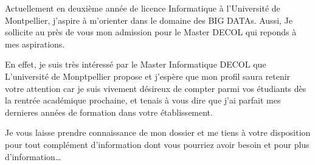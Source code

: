 \documentclass[10pt,stdletter]{newlfm}
\begin{document}
\begin{newlfm}


Actuellement en deuxième année de licence Informatique à l'Université de Montpellier, j'aspire à m'orienter dans le domaine des BIG DATAs. Aussi, Je sollicite au près de vous mon admission pour le Master DECOL qui reponds à mes aspirations.

En effet, je suis très intéressé par le Master Informatique DECOL que L'université de Monptpellier propose et j'espère que mon profil saura retenir votre attention car je suis vivement désireux de compter parmi vos étudiants dès la rentrée académique prochaine, et tenais à vous dire que j'ai parfait mes dernieres années de formation dans votre établissement.

Je vous laisse prendre connaissance de mon dossier et me tiens à votre disposition pour tout complément d'information dont vous pourriez avoir besoin et pour plus d'information\ldots{}

\end{newlfm}
\end{document}
